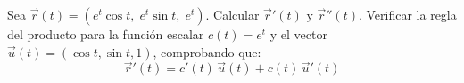 Sea $\vec{r}(t) = (e^t \cos t,\; e^t \sin t,\; e^t)$. Calcular $\vec{r}'(t)$ y $\vec{r}''(t)$. Verificar la regla del producto para la función escalar $c(t) = e^t$ y el vector $\vec{u}(t) = (\cos t, \sin t, 1)$, comprobando que:
\[ \vec{r}'(t) = c'(t)\,\vec{u}(t) + c(t)\,\vec{u}'(t) \]